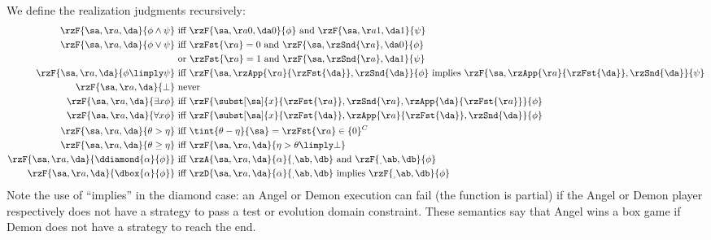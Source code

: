 We define the realization judgments recursively:
\begin{align*}
\rzF{\sa,\aa,\da}{\phi \land \psi}        &\text{ iff }\rzF{\sa,\aa 0,\da 0}{\phi}\text{ and }\rzF{\sa,\aa 1,\da 1}{\psi}\\
\rzF{\sa,\aa,\da}{\phi \lor \psi}         &\text{ iff }\rzFst{\aa}=0\text{ and }\rzF{\sa,\rzSnd{\aa},\da 0}{\phi}\\
                                          &\text{ or }\rzFst{\aa}=1\text{ and }\rzF{\sa,\rzSnd{\aa},\da 1}{\psi}\\
\rzF{\sa,\aa,\da}{\phi \limply \psi}      &\text{ iff }\rzF{\sa,\rzApp{\aa}{\rzFst{\da}},\rzSnd{\da}}{\phi}\text{ implies }\rzF{\sa,\rzApp{\aa}{\rzFst{\da}},\rzSnd{\da}}{\psi}\\
\rzF{\sa,\aa,\da}{\bot}                   &\text{ never}\\
\rzF{\sa,\aa,\da}{\exists{x}{\phi}}       &\text{ iff }\rzF{\subst[\sa]{x}{\rzFst{\aa}},\rzSnd{\aa},\rzApp{\da}{\rzFst{\aa}}}{\phi}\\
\rzF{\sa,\aa,\da}{\forall{x}{\phi}}       &\text{ iff }\rzF{\subst[\sa]{x}{\rzFst{\da}},\rzApp{\aa}{\rzFst{\da}},\rzSnd{\da}}{\phi}\\
\rzF{\sa,\aa,\da}{\theta > \eta}          &\text{ iff }\tint{\theta - \eta}{\sa} = \rzFst{\aa} \in \{0\}^C\\
\rzF{\sa,\aa,\da}{\theta \geq \eta}       &\text{ iff }\rzF{\sa,\aa,\da}{\eta > \theta \limply \bot}\\
\rzF{\sa,\aa,\da}{\ddiamond{\alpha}{\phi}}&\text{ iff } \rzA{\sa,\aa,\da}{\alpha}{\sb,\ab,\db}\text{ and }\rzF{\sb,\ab,\db}{\phi}\\
\rzF{\sa,\aa,\da}{\dbox{\alpha}{\phi}}    &\text{ iff } \rzD{\sa,\aa,\da}{\alpha}{\sb,\ab,\db}\text{ implies }\rzF{\sb,\ab,\db}{\phi}
\end{align*}
Note the use of ``implies'' in the diamond case: an Angel or Demon execution can fail (the function is partial) if the Angel or Demon player respectively does not have a strategy to pass a test or evolution domain constraint.
These semantics say that Angel wins a box game if Demon does not have a strategy to reach the end.

